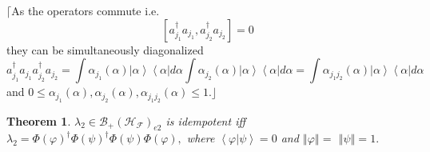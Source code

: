 \documentclass[aps,preprint]{revtex4}%
\newtheorem{theorem}{Theorem}
\begin{document}
$\lceil$As the operators commute i.e.
\begin{equation}
\left[  a_{j_{1}}^{\dagger}a_{j_{1}},a_{j_{2}}^{\dagger}a_{j_{2}}\right]  =0
\end{equation}
they can be simultaneously diagonalized
\begin{equation}
a_{j_{1}}^{\dagger}a_{j_{1}}a_{j_{2}}^{\dagger}a_{j_{2}}=\int\alpha_{j_{1}%
}\left(  \alpha\right)  \left\vert \alpha\right\rangle \left\langle
\alpha\right\vert d\alpha\int\alpha_{j_{2}}\left(  \alpha\right)  \left\vert
\alpha\right\rangle \left\langle \alpha\right\vert d\alpha=\int\alpha
_{j_{1}j_{2}}\left(  \alpha\right)  \left\vert \alpha\right\rangle
\left\langle \alpha\right\vert d\alpha
\end{equation}
and $0\leq\alpha_{j_{1}}\left(  \alpha\right)  ,\alpha_{j_{2}}\left(
\alpha\right)  ,\alpha_{j_{1}j_{2}}\left(  \alpha\right)  \leq1.\rfloor$

\begin{theorem}
$\lambda_{2}\in\mathcal{B}_{+}\left(  \mathcal{H}_{\mathcal{F}}\right)  _{e2}$
is idempotent iff $\lambda_{2}=\Phi\left(  \varphi\right)  ^{\dagger}%
\Phi\left(  \psi\right)  ^{\dagger}\Phi\left(  \psi\right)  \Phi\left(
\varphi\right)  ,$ where $\left\langle \varphi\left\vert \psi\right.
\right\rangle =0$ and $\left\Vert \varphi\right\Vert =$ $\left\Vert
\psi\right\Vert =1.$
\end{theorem}
\end{document}
